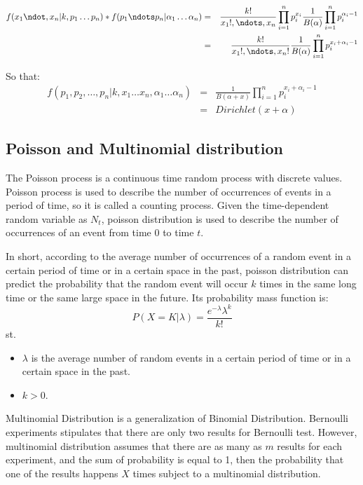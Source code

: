 \begin{eqnarray*}
  f(x_1\ndot,x_n|k,p_1\dots p_n)*f(p_1 \ndots p_n|\alpha_1 \dots \alpha_n) &=& \frac{k!}{x_1!,\ndots,x_n} \prod_{i=1}^n p_i^{x_i} \frac{1}{B(\alpha)} \prod_{i=1}^n p_i^{\alpha_i-1} \\
  &=& \frac{k!}{x_1!,\ndots,x_n!}  \frac{1}{B(\alpha)} \prod_{i=1}^n p_i^{x_i + \alpha_i-1} \\
\end{eqnarray*}

So that:
\begin{eqnarray*}
f(p_1,p_2,\dots,p_n|k,x_1 \dots x_n,\alpha_1 \dots \alpha_n) &=& \frac{1}{B(\alpha + x)} \prod_{i=1}^n p_i^{x_i + \alpha_i-1}\\
  &=& Dirichlet(x + \alpha)
\end{eqnarray*}







\subsection{Poisson and Multinomial distribution}

The Poisson process is a continuous time random process with discrete values. Poisson process is used to describe the number of occurrences of events in a period of time, so it is called a counting process. Given the time-dependent random variable as $N_t$, poisson distribution is used to describe the number of occurrences of an event from time 0 to time $t$.


In short, according to the average number of occurrences of a random event in a certain period of time or in a certain space in the past, poisson distribution can predict the probability that the random event will occur $k$ times in the same long time or the same large space in the future. Its probability mass function is:
\[
  P(X=K|\lambda) = \frac{e^{-\lambda} \lambda^k}{k!}
\]
st.
\begin{itemize}
  \item
$\lambda$ is the average number of random events in a certain period of time or in a certain space in the past.
\item$ k>0$.
\end{itemize}


Multinomial Distribution is a generalization of Binomial Distribution. Bernoulli experiments stipulates that there are only two results for Bernoulli test. However, multinomial distribution assumes that there are as many as $m$ results for each experiment, and the sum of probability is equal to 1, then the probability that one of the results happens $X$ times subject to  a multinomial distribution.

